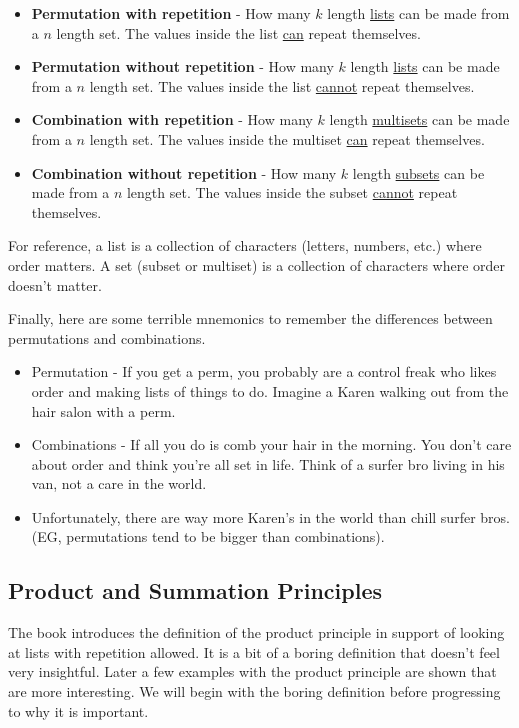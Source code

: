 \documentclass{article}
\begin{document}
\begin{itemize}
    \item \textbf{Permutation with repetition} - How many $k$ length \underline{lists} can be made from a $n$ length set. The values inside the list \underline{can} repeat themselves.
    \item \textbf{Permutation without repetition} - How many $k$ length \underline{lists} can be made from a $n$ length set. The values inside the list \underline{cannot} repeat themselves.
    \item \textbf{Combination with repetition} - How many $k$ length \underline{multisets} can be made from a $n$ length set. The values inside the multiset \underline{can} repeat themselves.
    \item \textbf{Combination without repetition} - How many $k$ length \underline{subsets} can be made from a $n$ length set. The values inside the subset \underline{cannot} repeat themselves.
\end{itemize}

For reference, a list is a collection of characters (letters, numbers, etc.) where order matters. A set (subset or multiset) is a collection of characters where order doesn't matter.\medskip

Finally, here are some terrible mnemonics to remember the differences between permutations and combinations.

\begin{itemize}
    \item Permutation - If you get a perm, you probably are a control freak who likes order and making lists of things to do. Imagine a Karen walking out from the hair salon with a perm.
    \item Combinations - If all you do is comb your hair in the morning. You don't care about order and think you're all set in life. Think of a surfer bro living in his van, not a care in the world.
    \item Unfortunately, there are way more Karen's in the world than chill surfer bros. (EG, permutations tend to be bigger than combinations).
\end{itemize}

\subsection{Product and Summation Principles}

The book introduces the definition of the product principle in support of looking at lists with repetition allowed. It is a bit of a boring definition that doesn't feel very insightful. Later a few examples with the product principle are shown that are more interesting. We will begin with the boring definition before progressing to why it is important.
\end{document}
